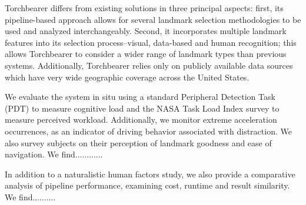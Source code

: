 Torchbearer differs from existing solutions in three principal aspects: first, its pipeline-based approach allows for several landmark selection methodologies to be used and analyzed interchangeably. Second, it incorporates multiple landmark features into its selection process--visual, data-based and human recognition; this allows Torchbearer to consider a wider range of landmark types than previous systems. Additionally, Torchbearer relies only on publicly available data sources which have very wide geographic coverage across the United States.

We evaluate the system in situ using a standard Peripheral Detection Task (PDT) to measure cognitive load and the NASA Task Load Index survey to measure perceived workload. Additionally, we monitor extreme acceleration occurrences, as an indicator of driving behavior associated with distraction. We also survey subjects on their perception of landmark goodness and ease of navigation. We find............

In addition to a naturalistic human factors study, we also provide a comparative analysis of pipeline performance, examining cost, runtime and result similarity. We find..........

